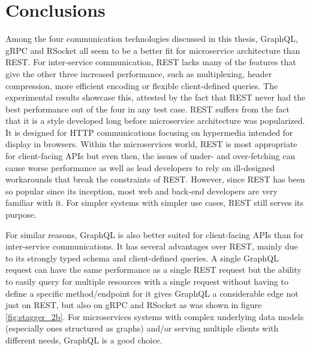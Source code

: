 \chapter{Conclusions}
Among the four communication technologies discussed in this thesis, GraphQL, gRPC and RSocket all seem to be a better fit for microservice architecture than REST. For inter-service communication, REST lacks many of the features that give the other three increased performance, such as multiplexing, header compression, more efficient encoding or flexible client-defined queries. The experimental results showcase this, attested by the fact that REST never had the best performance out of the four in any test case. REST suffers from the fact that it is a style developed long before microservice architecture was popularized. It is designed for HTTP communications focusing on hypermedia intended for display in browsers. Within the microservices world, REST is most appropriate for client-facing APIs but even then, the issues of under- and over-fetching can cause worse performance as well as lead developers to rely on ill-designed workarounds that break the constraints of REST. However, since REST has been so popular since its inception, most web and back-end developers are very familiar with it. For simpler systems with simpler use cases, REST still serves its purpose.

For similar reasons, GraphQL is also better suited for client-facing APIs than for inter-service communications. It has several advantages over REST, mainly due to its strongly typed schema and client-defined queries. A single GraphQL request can have the same performance as a single REST request but the ability to easily query for multiple resources with a single request without having to define a specific method/endpoint for it gives GraphQL a considerable edge not just on REST, but also on gRPC and RSocket as was shown in figure \ref{fig:stagger_2b}. For microservices systems with complex underlying data models (especially ones structured as graphs) and/or serving multiple clients with different needs, GraphQL is a good choice.

